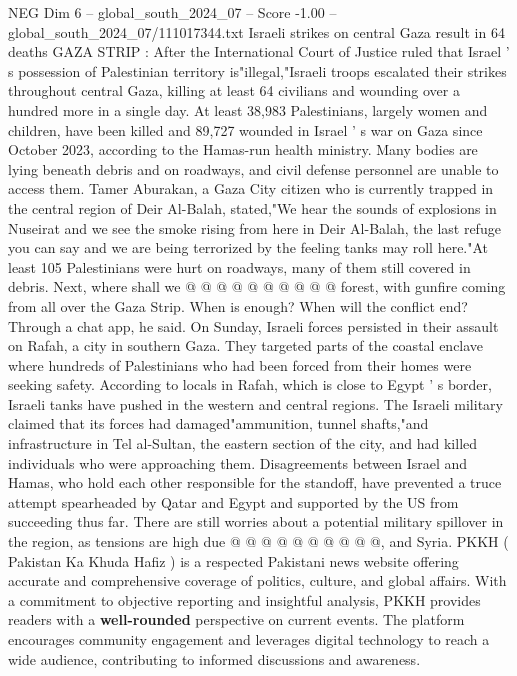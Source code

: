 \begin{textsample}{NEG Dim 6 – global\_south\_2024\_07 – Score -1.00 – global\_south\_2024\_07/111017344.txt}  \label{ex:f6_neg_120}
Israeli strikes on central Gaza result in 64 deaths GAZA STRIP : After the International Court of Justice ruled that Israel ' s possession of Palestinian territory is"illegal,"Israeli troops escalated their strikes throughout central Gaza, killing at least 64 civilians and wounding over a hundred more in a single day.
At least 38,983 Palestinians, largely women and children, have been killed and 89,727 wounded in Israel ' s war on Gaza since October 2023, according to the Hamas-run health ministry.
Many bodies are lying beneath debris and on roadways, and civil defense personnel are unable to access them.
Tamer Aburakan, a Gaza City citizen who is currently trapped in the central region of Deir Al-Balah, stated,"We hear the sounds of explosions in Nuseirat and we see the smoke rising from here in Deir Al-Balah, the last refuge you can say and we are being terrorized by the feeling tanks may roll here."At least 105 Palestinians were hurt on roadways, many of them still covered in debris.
Next, where shall we @ @ @ @ @ @ @ @ @ @ forest, with gunfire coming from all over the Gaza Strip.
When is enough?
When will the conflict end?
Through a chat app, he said.
On Sunday, Israeli forces persisted in their assault on Rafah, a city in southern Gaza.
They targeted parts of the coastal enclave where hundreds of Palestinians who had been forced from their homes were seeking safety.
According to locals in Rafah, which is close to Egypt ' s border, Israeli tanks have pushed in the western and central regions.
The Israeli military claimed that its forces had damaged"ammunition, tunnel shafts,"and infrastructure in Tel al-Sultan, the eastern section of the city, and had killed individuals who were approaching them.
Disagreements between Israel and Hamas, who hold each other responsible for the standoff, have prevented a truce attempt spearheaded by Qatar and Egypt and supported by the US from succeeding thus far.
There are still worries about a potential military spillover in the region, as tensions are high due @ @ @ @ @ @ @ @ @ @, and Syria.
PKKH ( Pakistan Ka Khuda Hafiz ) is a respected Pakistani news website offering accurate and comprehensive coverage of politics, culture, and global affairs.
With a commitment to objective reporting and insightful analysis, PKKH provides readers with a \textbf{well-rounded} perspective on current events.
The platform encourages community engagement and leverages digital technology to reach a wide audience, contributing to informed discussions and awareness.

\end{textsample}
